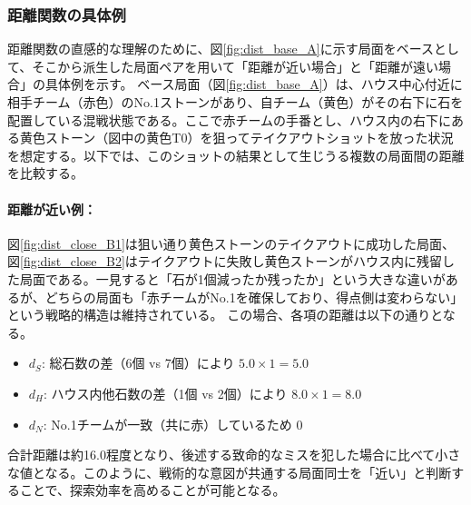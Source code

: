 \documentclass[11pt,a4j]{jreport}
\begin{document}
\begin{enumerate}
    \subsubsection{距離関数の具体例}

    距離関数の直感的な理解のために、図\ref{fig:dist_base_A}に示す局面をベースとして、そこから派生した局面ペアを用いて「距離が近い場合」と「距離が遠い場合」の具体例を示す。
    ベース局面（図\ref{fig:dist_base_A}）は、ハウス中心付近に相手チーム（赤色）のNo.1ストーンがあり、自チーム（黄色）がその右下に石を配置している混戦状態である。ここで赤チームの手番とし、ハウス内の右下にある黄色ストーン（図中の黄色T0）を狙ってテイクアウトショットを放った状況を想定する。以下では、このショットの結果として生じうる複数の局面間の距離を比較する。

    \paragraph{距離が近い例：}
    図\ref{fig:dist_close_B1}は狙い通り黄色ストーンのテイクアウトに成功した局面、図\ref{fig:dist_close_B2}はテイクアウトに失敗し黄色ストーンがハウス内に残留した局面である。一見すると「石が1個減ったか残ったか」という大きな違いがあるが、どちらの局面も「赤チームがNo.1を確保しており、得点側は変わらない」という戦略的構造は維持されている。
    この場合、各項の距離は以下の通りとなる。
    \begin{itemize}
        \item $d_S$: 総石数の差（6個 vs 7個）により $5.0 \times 1 = 5.0$
        \item $d_H$: ハウス内他石数の差（1個 vs 2個）により $8.0 \times 1 = 8.0$
        \item $d_N$: No.1チームが一致（共に赤）しているため $0$
    \end{itemize}
    合計距離は約16.0程度となり、後述する致命的なミスを犯した場合に比べて小さな値となる。このように、戦術的な意図が共通する局面同士を「近い」と判断することで、探索効率を高めることが可能となる。


\end{enumerate}
\end{document}

